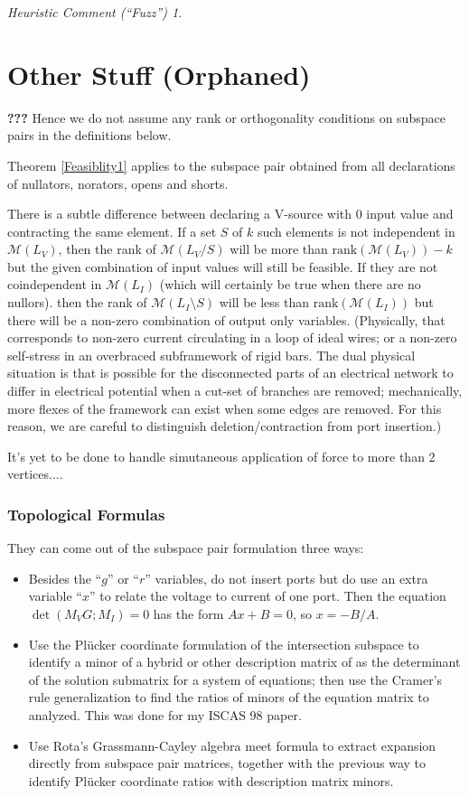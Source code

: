 \documentclass{amsproc-sunycstr}
\theoremstyle{plain}
\theoremstyle{definition}
\theoremstyle{remark}
\newtheorem{fuzz}{Heuristic Comment (``Fuzz'')}
\newcommand{\extra}[1]{{{#1}}}
\begin{document}
\begin{fuzz}
\section{Other Stuff (Orphaned)}

\extra{\textbf{???}
Hence we do not assume any rank or orthogonality conditions on subspace 
pairs in the definitions below.}



%
Theorem \ref{Feasiblity1} applies to the subspace pair
obtained from all declarations of nullators, norators, opens and shorts.


There is a subtle difference between declaring a V-source with 0
input value and contracting the same element.  If a set $S$ 
of $k$ such elements
is not independent in $\mathcal{M}(L_V)$, then the rank of $\mathcal{M}(L_V/S)$
will be more than
$\mbox{rank}(\mathcal{M}(L_V))-k$ but the given combination of input values
will still be feasible.  If they are not coindependent in
$\mathcal{M}(L_I)$ (which will certainly be true when there are no nullors).
then the rank of $\mathcal{M}(L_I\setminus S)$ will be less than 
$\mbox{rank}(\mathcal{M}(L_I))$ but there will be a non-zero combination of
output only variables.  (Physically, that corresponds to non-zero current 
circulating in a loop of ideal wires; or a non-zero self-stress in an
overbraced subframework of rigid bars.  The dual physical situation
is that is possible for the disconnected parts of an electrical network
to differ in electrical potential when a cut-set of branches are removed;
mechanically, more flexes of the framework can exist when some edges are
removed. For this reason, we are careful to distinguish deletion/contraction
from port insertion.)


It's yet to be done to handle simutaneous application of force to more 
than 2 vertices....


\subsubsection{Topological Formulas}

They can come out of the subspace pair formulation three ways:
\begin{itemize}
\item  Besides the ``$g$'' or ``$r$'' variables, do not insert ports but
do use an extra variable ``$x$'' to relate the voltage to current of one port.
Then the equation $\det(M_VG;M_I)=0$ has the form $Ax+B=0$, so $x=-B/A$.
\item Use the Pl\"{u}cker coordinate formulation of the intersection subspace to 
identify a minor of a hybrid or other description matrix of as the determinant
of the solution submatrix for a system of equations; then use the Cramer's
rule generalization to find the ratios of minors of the equation 
matrix to analyzed.  
This was done for my ISCAS 98 paper.
\item Use Rota's Grassmann-Cayley algebra meet formula to extract expansion
directly from subspace pair matrices, together with the previous way to
identify Pl\"{u}cker coordinate ratios with description matrix minors.
\end{itemize}


\end{fuzz}
\end{document}
